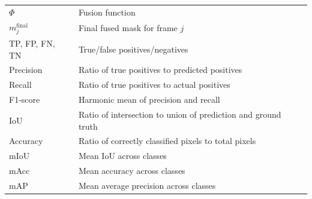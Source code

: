 \documentclass[preprint,12pt]{elsarticle}
\begin{document}
\begin{table}[!htbp]
\begin{tabular}{l p{8cm}}
\rowcolor{gray!12}$\Phi$ & Fusion function \\
$m_j^{\mathrm{final}}$ & Final fused mask for frame $j$ \\
\rowcolor{gray!12}TP, FP, FN, TN & True/false positives/negatives \\
Precision & Ratio of true positives to predicted positives \\
\rowcolor{gray!12}Recall & Ratio of true positives to actual positives \\
F1-score & Harmonic mean of precision and recall \\
\rowcolor{gray!12}IoU & Ratio of intersection to union of prediction and ground truth \\
Accuracy & Ratio of correctly classified pixels to total pixels \\
\rowcolor{gray!12}mIoU & Mean IoU across classes \\
mAcc & Mean accuracy across classes \\
\rowcolor{gray!12}mAP & Mean average precision across classes \\
\bottomrule
\end{tabular}
\end{table}
\end{document}
